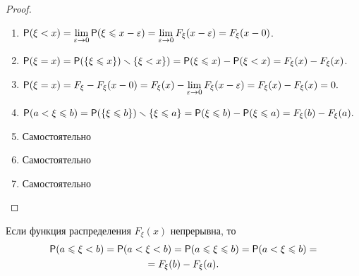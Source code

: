 \begin{proof}
	\begin{enumerate}
		\item $\P(\xi<x)=\lim\limits_{\varepsilon\to 0} \P(\xi\leqslant x-\varepsilon)=
		\lim\limits_{\varepsilon\to 0} F_{\xi}(x-\varepsilon)=F_{\xi}(x-0)$.

		\item $\P(\xi=x)=\P(\{\xi\leqslant x\})\ssm\{\xi<x \})=\P(\xi\leqslant x)-\P(\xi<x)=F_{\xi}(x)-F_{\xi}(x)$.

		\item $\P(\xi=x)=F_{\xi}-F_{\xi}(x-0)=F_{\xi}(x)-\lim\limits_{\varepsilon\to 0} F_{\xi}(x-\varepsilon)=F_{\xi}(x)-F_{\xi}(x)=0.$

		\item $\P(a<\xi\leqslant b)= \P(\{\xi\leqslant b \})\ssm \{\xi\leqslant a \}=
		\P(\xi\leqslant b)-\P(\xi\leqslant a)= F_{\xi}(b)-F_{\xi}(a).$

		\item Самостоятельно

		\item Самостоятельно

		\item Самостоятельно
	\end{enumerate}
\end{proof}

\begin{consq}
\label{consq:11.7}
	Если функция распределения $F_{\xi}(x)$ непрерывна, то 
	\begin{gather*}
		\P(a\leqslant \xi<b)=\P(a<\xi<b)=\P(a\leqslant \xi \leqslant b)= \P(a< \xi\leqslant b)= \\ 
		=F_{\xi}(b)-F_{\xi}(a).
	\end{gather*}
\end{consq}